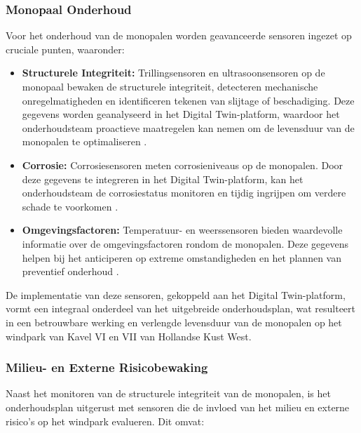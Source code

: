 \subsubsection{Monopaal Onderhoud}
Voor het onderhoud van de monopalen worden geavanceerde sensoren ingezet op cruciale punten, waaronder:
\begin{itemize}
    \item \textbf{Structurele Integriteit:} Trillingsensoren en ultrasoonsensoren op de monopaal bewaken de structurele integriteit, detecteren mechanische onregelmatigheden en identificeren tekenen van slijtage of beschadiging. Deze gegevens worden geanalyseerd in het Digital Twin-platform, waardoor het onderhoudsteam proactieve maatregelen kan nemen om de levensduur van de monopalen te optimaliseren \cite{5406794}.
    \item \textbf{Corrosie:} Corrosiesensoren meten corrosieniveaus op de monopalen. Door deze gegevens te integreren in het Digital Twin-platform, kan het onderhoudsteam de corrosiestatus monitoren en tijdig ingrijpen om verdere schade te voorkomen \cite{5406794}.
    \item \textbf{Omgevingsfactoren:} Temperatuur- en weerssensoren bieden waardevolle informatie over de omgevingsfactoren rondom de monopalen. Deze gegevens helpen bij het anticiperen op extreme omstandigheden en het plannen van preventief onderhoud \cite{5406794}.
\end{itemize}

De implementatie van deze sensoren, gekoppeld aan het Digital Twin-platform, vormt een integraal onderdeel van het uitgebreide onderhoudsplan, wat resulteert in een betrouwbare werking en verlengde levensduur van de monopalen op het windpark van Kavel VI en VII van Hollandse Kust West. \cite{WPE}


\subsubsection{Milieu- en Externe Risicobewaking}
Naast het monitoren van de structurele integriteit van de monopalen, is het onderhoudsplan uitgerust met sensoren die de invloed van het milieu en externe risico's op het windpark evalueren. Dit omvat:

